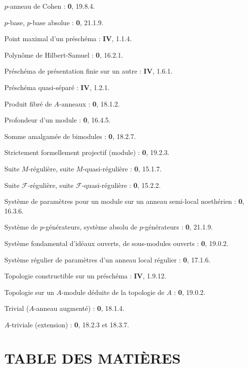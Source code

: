 $p$-anneau de Cohen : \textbf{0}, 19.8.4.\par
$p$-base, $p$-base absolue : \textbf{0}, 21.1.9.\par
Point maximal d'un préschéma : \textbf{IV}, 1.1.4.\par

\clearpage
{}
Polynôme de Hilbert-Samuel : \textbf{0}, 16.2.1.\par
Préschéma de présentation finie sur un autre : \textbf{IV}, 1.6.1.\par
Préschéma quasi-séparé : \textbf{IV}, 1.2.1.\par
Produit fibré de $A$-anneaux : \textbf{0}, 18.1.2.\par
Profondeur d'un module : \textbf{0}, 16.4.5.\par

Somme amalgamée de bimodules : \textbf{0}, 18.2.7.\par
Strictement formellement projectif (module) : \textbf{0}, 19.2.3.\par
Suite $M$-régulière, suite $M$-quasi-régulière : \textbf{0}, 15.1.7.\par
Suite $\mathscr F$-régulière, suite $\mathscr F$-quasi-régulière : \textbf{0}, 15.2.2.\par
Système de paramètres pour un module sur un anneau semi-local noethérien : \textbf{0}, 16.3.6.\par
Système de $p$-générateurs, système absolu de $p$-générateurs : \textbf{0}, 21.1.9.\par
Système fondamental d'idéaux ouverts, de sous-modules ouverts : \textbf{0}, 19.0.2.\par
Système régulier de paramètres d'un anneau local régulier : \textbf{0}, 17.1.6.\par

Topologie constructible sur un préschéma : \textbf{IV}, 1.9.12.\par
Topologie sur un $A$-module déduite de la topologie de $A$ : \textbf{0}, 19.0.2.\par
Trivial ($A$-anneau augmenté) : \textbf{0}, 18.1.4.\par
$A$-triviale (extension) : \textbf{0}, 18.2.3 et 18.3.7.\par

\clearpage
{}
{}
\section*{TABLE DES MATIÈRES}

